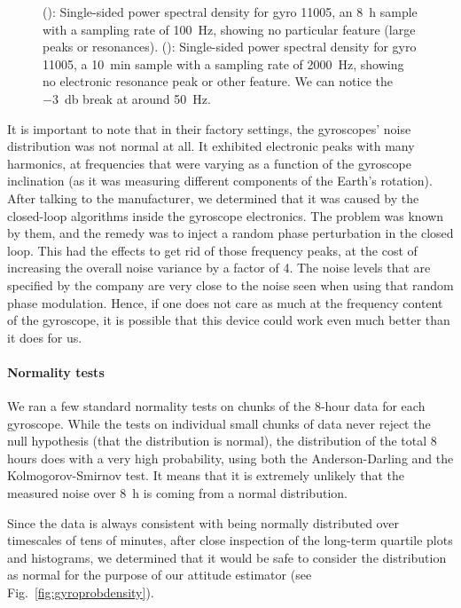 \begin{figure}[!h]
\begin{subfigure}[b]{0.5\textwidth}
		\caption{}
		\label{subfig:sspsd2000-11005}
\end{subfigure}
\label{fig:gyrospectra}
\caption[Power spectral density]{(): Single-sided power spectral density for gyro 11005, an \SI{8}{\hour} sample with a sampling rate of \SI{100}{\hertz}, showing no particular feature (large peaks or resonances). (): Single-sided power spectral density for gyro 11005, a \SI{10}{\minute} sample with a sampling rate of \SI{2000}{\hertz}, showing no electronic resonance peak or other feature. We can notice the \SI{-3}{\decibel} break at around \SI{50}{\hertz}.}
\end{figure}

It is important to note that in their factory settings, the gyroscopes' noise distribution was not normal at all. It exhibited electronic peaks with many harmonics, at frequencies that were varying as a function of the gyroscope inclination (as it was measuring different components of the Earth's rotation). After talking to the manufacturer, we determined that it was caused by the closed-loop algorithms inside the gyroscope electronics. The problem was known by them, and the remedy was to inject a random phase perturbation in the closed loop. This had the effects to get rid of those frequency peaks, at the cost of increasing the overall noise variance by a factor of 4. The noise levels that are specified by the company are very close to the noise seen when using that random phase modulation. Hence, if one does not care as much at the frequency content of the gyroscope, it is possible that this device could work even much better than it does for us.



\paragraph{Normality tests}

We ran a few standard normality tests on chunks of the 8-hour data for each gyroscope. While the tests on individual small chunks of data never reject the null hypothesis (that the distribution is normal), the distribution of the total 8 hours does with a very high probability, using both the Anderson-Darling and the Kolmogorov-Smirnov test. It means that it is extremely unlikely that the measured noise over \SI{8}{\hour} is coming from a normal distribution.

Since the data is always consistent with being normally distributed over timescales of tens of minutes, after close inspection of the long-term quartile plots and histograms, we determined that it would be safe to consider the distribution as normal for the purpose of our attitude estimator (see Fig.~\ref{fig:gyroprobdensity}). 


